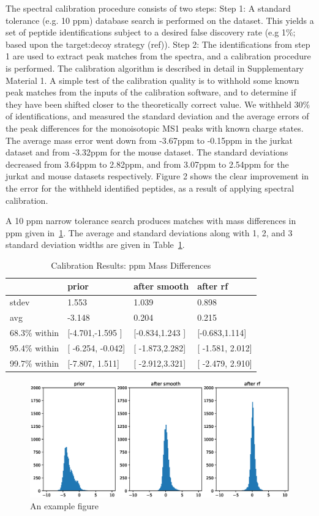 \documentclass[journal=jprobs,manuscript=article]{achemso}
\begin{document}
The spectral calibration procedure consists of two steps: Step 1: A standard tolerance (e.g. 10 ppm) database search is performed on the dataset.
This yields a set of peptide identifications subject to a desired false discovery rate (e.g 1\%; based upon the target:decoy strategy (ref)).
Step 2:  The identifications from step 1 are used to extract peak matches from the spectra, and a calibration procedure is performed.
The calibration algorithm is described in detail in Supplementary Material 1.
A simple test of the calibration quality is to withhold some known peak matches from the inputs of the calibration software, and to determine if they have been shifted closer to the theoretically correct value.
We withheld 30\% of identifications, and measured the standard deviation and the average errors of the peak differences for the monoisotopic MS1 peaks with known charge states.
The average mass error went down from -3.67ppm to -0.15ppm in the jurkat dataset and from -3.32ppm for the mouse dataset.
The standard deviations decreased from 3.64ppm to 2.82ppm, and from 3.07ppm to 2.54ppm for the jurkat and mouse datasets respectively.
Figure 2 shows the clear improvement in the error for the withheld identified peptides, as a result of applying spectral calibration.

A 10 ppm narrow tolerance search produces matches with mass differences in ppm given in~\ref{fgr:figure1}.
The average and standard deviations along with 1, 2, and 3 standard deviation widths are given in Table~\ref{tbl:calib}.

\begin{table}
  \caption{Calibration Results: ppm Mass Differences}
  \label{tbl:calib}
  \begin{tabular}{llll}
    \hline
    & prior& after smooth & after rf  \\
    \hline
    stdev&	1.553	&1.039&	0.898 \\
	avg&	-3.148&	0.204&0.215\\
	68.3\% within	& [-4.701,-1.595 ]&	[-0.834,1.243	]&	[-0.683,1.114]\\
	95.4\% within&[	-6.254,	-0.042]&[	-1.873,2.282]&[	-1.581,	2.012]\\
	99.7\% within&	[-7.807,	1.511]&[	-2.912,3.321]&[	-2.479,	2.910]\\
    \hline
  \end{tabular}
\end{table}


\begin{figure}
  \includegraphics[scale=0.6]{figure_1.eps}
  \caption{An example figure}
  \label{fgr:figure1}
\end{figure}
\end{document}

